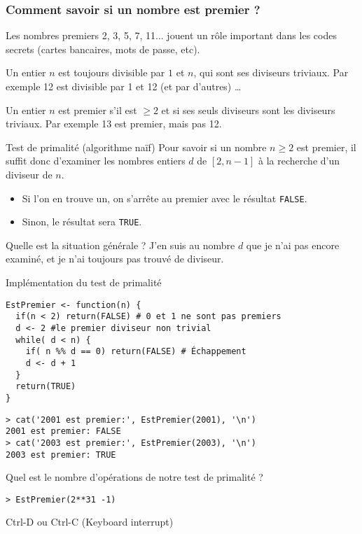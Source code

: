 \documentclass[10pt]{beamer}
\begin{document}
\begin{frame}
  \frametitle{Comment savoir si un nombre est premier ?}
Les nombres premiers 2, 3, 5, 7, 11... jouent un rôle important dans les codes secrets (cartes bancaires, mots de passe, etc).

Un entier $n$ est toujours divisible par $1$ et $n$, qui sont ses diviseurs triviaux.
Par exemple 12 est divisible par 1 et 12 (et par d'autres) \dots

Un entier $n$ est premier s'il est $\geq 2$ et si ses seuls diviseurs sont les diviseurs triviaux.
Par exemple 13 est premier, mais pas 12.

\begin{block}{Test de primalité (algorithme naïf)}
  Pour savoir si un nombre $n \geq 2$ est premier, il suffit donc d'examiner les nombres entiers $d$ de $[2,n-1]$ à la recherche d'un diviseur de $n$.
  \begin{itemize}
  \item Si l'on en trouve un, on s'arrête au premier avec le résultat \texttt{FALSE}.
  \item Sinon, le résultat sera \texttt{TRUE}.

  \end{itemize}
\end{block}

\begin{block}{Quelle est la situation générale ?}
 J'en suis au nombre $d$ que je n'ai pas encore examiné, et je n'ai toujours pas trouvé de diviseur.
\end{block}
\end{frame}
\begin{frame}[fragile]{Implémentation du test de primalité}
  \begin{lstlisting}[style=editor]
EstPremier <- function(n) {
  if(n < 2) return(FALSE) # 0 et 1 ne sont pas premiers
  d <- 2 #le premier diviseur non trivial
  while( d < n) {
    if( n %% d == 0) return(FALSE) # Échappement
    d <- d + 1
  }
  return(TRUE)
}
\end{lstlisting}

\begin{lstlisting}
> cat('2001 est premier:', EstPremier(2001), '\n')
2001 est premier: FALSE
> cat('2003 est premier:', EstPremier(2003), '\n')
2003 est premier: TRUE
\end{lstlisting}

\begin{alertblock}{Quel est le nombre d'opérations de notre test de primalité ?}
  \begin{lstlisting}[style=edblock]
> EstPremier(2**31 -1)
\end{lstlisting}
Ctrl-D ou Ctrl-C (Keyboard interrupt)
\end{alertblock}
\end{frame}
\end{document}
